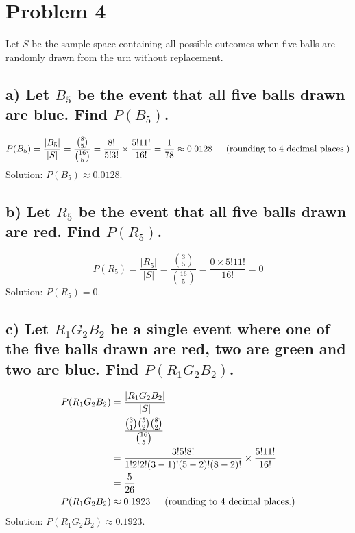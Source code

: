 \documentclass[11pt, letterpaper]{article}
\begin{document}
\section*{Problem 4}
Let $S$ be the sample space containing all possible outcomes when five balls are randomly drawn from the urn without replacement.

\subsection*{a) \normalfont Let $B_5$ be the event that all five balls drawn are blue. Find $P(B_5)$.}
\[P(B_5)=\frac{|B_5|}{|S|}=\frac{{8 \choose 5}}{{16 \choose 5}}=\frac{8!}{5!3!}\times\frac{5!11!}{16!}=\frac{1}{78}\approx 0.0128 \text{\indent (rounding to 4 decimal places.)}\]
Solution: $P(B_5)\approx 0.0128$.

\subsection*{b) \normalfont Let $R_5$ be the event that all five balls drawn are red. Find $P(R_5)$.}
\[P(R_5)=\frac{|R_5|}{|S|}=\frac{{3 \choose 5}}{{16 \choose 5}}=\frac{0\times 5!11!}{16!}=0\]
Solution: $P(R_5)=0$.

\subsection*{c) \normalfont Let $R_1G_2B_2$ be a single event where one of the five balls drawn are red, two are green and two are blue. Find $P(R_1G_2B_2)$.}
\begin{align*}
    P(R_1G_2B_2)&=\frac{|R_1G_2B_2|}{|S|}\\
    &=\frac{{3 \choose 1}{5 \choose 2}{8 \choose 2}}{{16 \choose 5}}\\
    &=\frac{3!5!8!}{1!2!2!(3-1)!(5-2)!(8-2)!}\times\frac{5!11!}{16!}\\
    &=\frac{5}{26}\\
    P(R_1G_2B_2)&\approx 0.1923 \text{\indent (rounding to 4 decimal places.)}
\end{align*}
Solution: $P(R_1G_2B_2)\approx 0.1923$.
\end{document}
